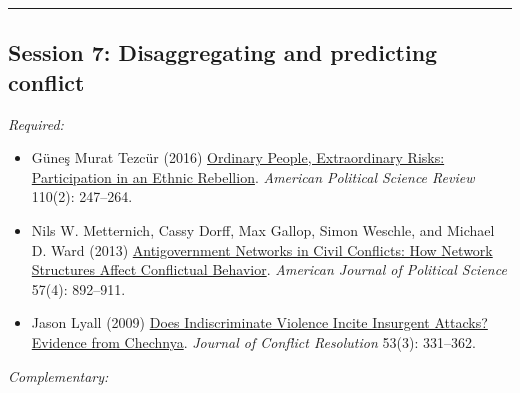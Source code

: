\documentclass[12pt, a4paper]{article}
\begin{document}
\vspace{20pt}
\hrule
\subsection*{Session 7: Disaggregating and predicting conflict}

\noindent\textit{Required:}

\begin{itemize}
	\item Güne\c{s} Murat Tezcür (2016) \href{https://doi.org/10.1017/S0003055416000150}{Ordinary People, Extraordinary Risks: Participation in an Ethnic Rebellion}. \textit{American Political Science Review} 110(2): 247--264.
	\item Nils W. Metternich, Cassy Dorff, Max Gallop, Simon Weschle, and Michael D. Ward (2013) \href{https://doi.org/10.1111/ajps.12039}{Antigovernment Networks in Civil Conflicts: How Network Structures Affect Conflictual Behavior}. \textit{American Journal of Political Science} 57(4): 892--911.
	\item Jason Lyall (2009) \href{https://doi.org/10.1177/0022002708330881}{Does Indiscriminate Violence Incite Insurgent Attacks? Evidence from Chechnya}. \textit{Journal of Conflict Resolution} 53(3): 331--362.
\end{itemize}



\noindent\textit{Complementary:}
\end{document}

